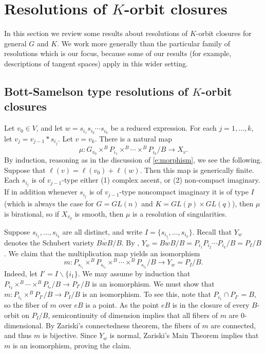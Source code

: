 \documentclass[11pt,letterpaper,reqno]{amsart}
\numberwithin{equation}{section}
\theoremstyle{plain}
\theoremstyle{definition}
\theoremstyle{remark}
\begin{document}
\section{Resolutions of $K$-orbit closures} \label{s:resolution}
In this section we review some results about resolutions of $K$-orbit closures for general
$G$ and $K$.  We work more generally than the particular family of resolutions
which is our focus, because some of our results (for example, descriptions of
tangent spaces) apply in this wider setting.

\subsection{Bott-Samelson type resolutions of $K$-orbit closures} \label{ss.generalities-resolutions}
Let $v_0 \in V$, and let $w = s_{i_1} s_{i_2} \cdots s_{i_k}$ be a reduced expression.  For each $j = 1, \ldots, k$, let
$v_j = v_{j-1} * s_{i_j}$.  Let $v = v_k$.  
There is a natural map
\begin{equation} \label{e:generalmu}
\mu: G_{v_0} \times^B P_{i_1} \times^B \cdots \times^B P_{i_k}/B \to X_v.
\end{equation}
By induction, reasoning as in the discussion of \eqref{e:morphism},
we see the following.
Suppose that $\ell(v) = \ell(v_0) + \ell(w)$. Then this map is generically finite.
Each $s_{i_j}$ is of $v_{j-1}$-type either (1) complex ascent, or (2) non-compact imaginary.
If in addition whenever $s_{i_j}$ is of $v_{j-1}$-type noncompact imaginary it is of type $I$ (which is always the case
for $G = GL(n)$ and $K = GL(p) \times GL(q)$), then $\mu$ is birational, so
if $X_{v_0}$ is smooth, then $\mu$ is a resolution of singularities.

Suppose $s_{i_1}, \ldots, s_{i_k}$ are all distinct, and write $I = \{ s_{i_1}, \ldots, s_{i_k}  \}$. 
Recall that $Y_w$ denotes the Schubert variety $\overline{BwB}/B$. 
By \cite[p. 50]{Springer98}, $Y_w=\overline{BwB}/B=P_{i_1}P_{i_2}\cdots P_{i_k}/B=P_I/B$.
We claim that the multiplication map yields an isomorphism
\begin{equation} \label{e.Bott-Samiso}
m:P_{s_{i_1}} \times^B P_{s_{i_2}} \times^B \cdots  \times^B P_{s_{i_k}}/B \to Y_w = P_I/B.
\end{equation}
Indeed, let $I' = I \smallsetminus \{ i_1 \}$.  We may assume by induction that
$P_{i_2} \times^B \cdots \times^B P_{i_r}/B \to P_{I'}/B$ is an isomorphism.
 We must show that
$m: P_{i_1} \times^B P_{I'}/B \to P_I/B$
 is an isomorphism. 
To see this, note that $P_{i_1} \cap P_{I'} = B$, so the fiber of $m$ over $eB$ is a point.  As the point $eB$ is in the closure of every $B$-orbit on $P_I/B$, semicontinuity of dimension 
implies that all fibers of $m$ are $0$-dimensional.
By Zariski's connectedness theorem, the fibers of $m$ are connected, and thus $m$ is bijective. Since $Y_w$ is normal,  Zariski's Main Theorem implies that $m$ is an isomorphism,
proving the claim.  
\end{document}
